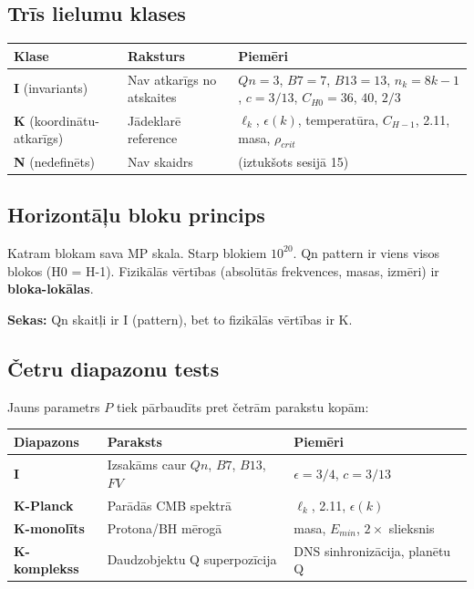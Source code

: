 \documentclass[12pt,a4paper]{article}
\begin{document}
\subsection*{Trīs lielumu klases}

\begin{table}[h]
\centering
\begin{tabular}{|l|l|l|}
\hline
\textbf{Klase} & \textbf{Raksturs} & \textbf{Piemēri} \\
\hline
\textbf{I} (invariants) & Nav atkarīgs no atskaites & $Qn=3$, $B7=7$, $B13=13$, $n_k=8k-1$, $c=3/13$, $C_{H0}=36$, $40$, $2/3$ \\
\textbf{K} (koordinātu-atkarīgs) & Jādeklarē reference & $\ell_k$, $\epsilon(k)$, temperatūra, $C_{H-1}$, 2.11, masa, $\rho_{crit}$ \\
\textbf{N} (nedefinēts) & Nav skaidrs & (iztukšots sesijā 15) \\
\hline
\end{tabular}
\end{table}

\subsection*{Horizontāļu bloku princips}

Katram blokam sava MP skala. Starp blokiem $10^{20}$. Qn pattern ir viens visos blokos (H0 = H-1). Fizikālās vērtības (absolūtās frekvences, masas, izmēri) ir \textbf{bloka-lokālas}.

\textbf{Sekas:} Qn skaitļi ir I (pattern), bet to fizikālās vērtības ir K.

\subsection*{Četru diapazonu tests}

Jauns parametrs $P$ tiek pārbaudīts pret četrām parakstu kopām:

\begin{table}[h]
\centering
\begin{tabular}{|l|l|l|}
\hline
\textbf{Diapazons} & \textbf{Paraksts} & \textbf{Piemēri} \\
\hline
\textbf{I} & Izsakāms caur $Qn$, $B7$, $B13$, $FV$ & $\epsilon = 3/4$, $c = 3/13$ \\
\textbf{K-Planck} & Parādās CMB spektrā & $\ell_k$, 2.11, $\epsilon(k)$ \\
\textbf{K-monolīts} & Protona/BH mērogā & masa, $E_{min}$, $2\times$ slieksnis \\
\textbf{K-komplekss} & Daudzobjektu Q superpozīcija & DNS sinhronizācija, planētu Q \\
\hline
\end{tabular}
\end{table}
\end{document}
